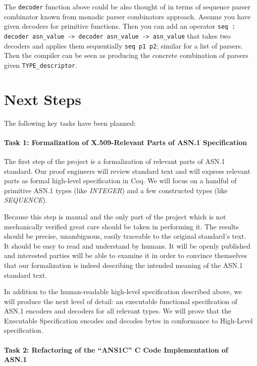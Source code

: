 \documentclass[acmsmall,nonacm]{acmart}
\begin{document}
 The \texttt{decoder} function above could be also thought of in terms
 of sequence parser combinator known from monadic parser combinators
 approach\cite{MPC}. Assume you have given decoders for primitive
 functions. Then you can add an operator \texttt{seq : decoder
   asn\_value -> decoder asn\_value -> asn\_value} that takes two
 decoders and applies them sequentially \texttt{seq p1 p2}; similar for a
 list of parsers. Then the compiler can be seen as producing the
 concrete combination of parsers given \texttt{TYPE\_descriptor}.

 \section{Next Steps}
The following key tasks have been planned:
 
\paragraph{Task 1: Formalization of X.509-Relevant Parts of ASN.1 Specification}
The first step of the project is a formalization of relevant parts of ASN.1 standard. Our proof engineers will review standard text and will express relevant parts as formal high-level specification in Coq. We will focus on a handful of primitive ASN.1 types (like \emph{INTEGER}) and a few constructed types (like \emph{SEQUENCE}).

Because this step is manual and the only part of the project which is not mechanically verified great care should be taken in performing it. The results should be precise, unambiguous, easily traceable to the original standard's text. It should be easy to read and understand by humans. It will be openly published and interested parties will be able to examine it in order to convince themselves that our formalization is indeed describing the intended meaning of the ASN.1 standard text.

In addition to the human-readable high-level specification described above, we will produce the next level of detail: an executable functional specification of ASN.1 encoders and decoders for all relevant types. We will prove that the Executable Specification encodes and decodes bytes in conformance to High-Level specification.

\paragraph{Task 2: Refactoring of the ``ANS1C'' C Code Implementation of ASN.1}
\end{document}
